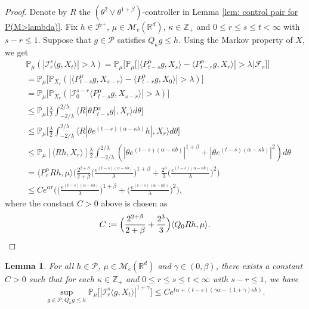 \documentclass[12pt,a4paper]{amsart}
\theoremstyle{plain}
\newtheorem{lem}[thm]{Lemma}
\theoremstyle{definition}
\numberwithin{equation}{section}
\begin{document}
\begin{proof}
    Denote by $R$ the $(\theta^2\vee\theta^{1+\beta})$-controller in Lemma \ref{lem: control pair for P(M>lambda)}.
    Fix $h \in \mathcal P^+$, $\mu \in \mathcal M_c(\mathbb R^d)$, $\kappa \in \mathbb Z_+ $ and $0\leq r\leq s\leq t < \infty$ with $s-r \leq 1$.
    Suppose that $g\in \mathcal P$ satisfies $Q_\kappa g \leq h$.
    Using the Markov property of $X$, we get
\begin{align}
    &\mathbb P_{\mu}(|\mathcal I_r^s\langle g, X_t\rangle|>\lambda)
    = \mathbb P_\mu \Big[\mathbb P_\mu\big[|\langle P_{t-s}^\alpha g, X_{s}\rangle - \langle P_{t-r}^\alpha g, X_{r}\rangle|> \lambda\big| \mathscr F_r\big]\Big]
    \\&= \mathbb P_\mu \big[\mathbb P_{X_r}(|\langle P_{t-s}^\alpha g, X_{s-r}\rangle - \langle P_{t-r}^\alpha g, X_{0}\rangle|> \lambda)\big]
    \\&= \mathbb P_\mu \big[\mathbb P_{X_r}(|\mathcal I_0^{s-r}\langle P_{t-s}^\alpha g, X_{s-r}\rangle |> \lambda)\big]
    \\&\leq \mathbb P_\mu \Big[ \frac{\lambda}{2}\int_{-2/\lambda}^{2/\lambda}\langle R|\theta P^\alpha_{t-s}g|,X_r\rangle d\theta \Big]
    \\&\leq \mathbb P_\mu \Big[ \frac{\lambda}{2}\int_{-2/\lambda}^{2/\lambda}\langle R|\theta e^{(t-s)(\alpha- \kappa b)}h|,X_r\rangle d\theta \Big]
    \\&\leq \mathbb P_\mu [ \langle Rh,X_r\rangle ] \frac{\lambda}{2}\int_{-2/\lambda}^{2/\lambda}(|\theta e^{(t-s)(\alpha- \kappa b)}|^{1+\beta} + |\theta e^{(t-s)(\alpha- \kappa b)}|^{2})d\theta
    \\& =  \langle P_r^\alpha Rh,\mu\rangle \bigg(  \frac{2^{2+\beta}}{2+\beta}\Big(\frac{e^{(t-s)(\alpha- \kappa b)}}{\lambda}\Big)^{1+\beta} + \frac{2^{3}}{3}\Big(\frac{e^{(t-s)(\alpha- \kappa b)}}{\lambda}\Big)^2\bigg)
    \\ & \leq C e^{\alpha r} \bigg(\Big( \frac{e^{(t-s)(\alpha - \kappa b)}}{\lambda}\Big)^{1+\beta} + \Big( \frac{e^{(t-s)(\alpha - \kappa b)}}{\lambda}\Big)^{2} \bigg),
\end{align}
    where the constant $C>0$ above is chosen as
\[
    C := \Big(\frac{2^{2+\beta}}{2+\beta} + \frac{2^{3}}{3} \Big)\langle Q_0Rh, \mu\rangle.
    \qedhere
\]
\end{proof}

\begin{lem}
\label{lem: control of mgtrs}
    For all $h \in \mathcal P$, $\mu \in \mathcal M_c(\mathbb R^d)$ and $\gamma\in (0, \beta)$, there exists a constant $C > 0$ such that for each $\kappa \in \mathbb Z_+$ and $0\leq r\leq s\leq t<\infty$ with $s-r \leq 1$, we have
\[
    \sup_{g \in \mathcal P: Q_\kappa g\leq h} \mathbb P_\mu\big[|\mathcal I_r^s\langle g, X_t\rangle|^{1+\gamma}\big]
    \leq C e^{t\alpha+(t-s) (\gamma\alpha- (1+\gamma)\kappa b)}.
\]
\end{lem}
\end{document}
